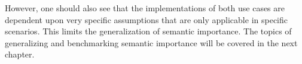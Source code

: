 However, one should also see that the implementations of both use cases are dependent upon very specific assumptions that are only applicable in specific scenarios.
This limits the generalization of semantic importance. 
The topics of generalizing and benchmarking semantic importance will be covered in the next chapter. 